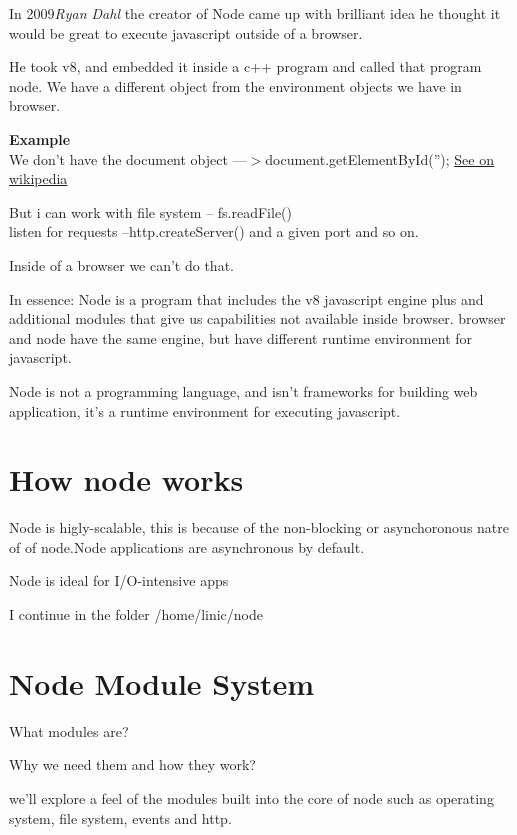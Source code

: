 \documentclass[a4paper,11pt,twoside]{article}
\begin{document}
    In 2009\textit{Ryan Dahl} the creator of Node came up with brilliant idea
    he thought it would be great to execute javascript outside of a browser.


    He took v8, and embedded it inside a c++ program and called that program node. We have 
    a different object from the environment objects we have in browser.

\vspace{1cm}
    \textbf{Example} \\{}
    We don't have the document object  ---\(>\)document.getElementById(''); \href{https://en.wikipedia.org/wiki/Document_Object_Model}{See on wikipedia} 
    
\vspace{1cm}
    But i can work with file system -- fs.readFile()\\{}
    listen for requests --http.createServer()  and a given port and so on.


    Inside of a browser we can't do that.


    In essence: Node is a program that includes the v8 javascript engine plus and additional modules
    that give us capabilities not available inside browser. 
    browser and node have the same engine, but have different runtime environment for javascript.


    Node is not a programming language, and isn't frameworks for building web application, 
    it's a runtime environment for executing javascript.



   \newpage
   \section{How node works}
   Node is higly-scalable, this is because of the non-blocking or asynchoronous natre of 
   of node.Node applications are asynchronous by default.


   Node is ideal for I/O-intensive apps
   
   I continue in the folder /home/linic/node 


   \section{Node Module System}
   What modules are? 


   Why we need them and how they work?


   we'll explore a feel of the modules built into the core of node such as operating system, file system, events and http. 
\end{document}
